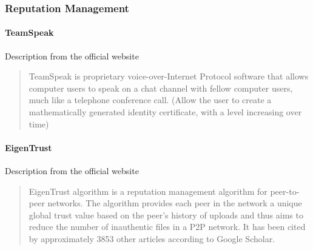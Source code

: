 
\subsubsection{Reputation Management}

\paragraph{TeamSpeak}
Description from the official website \cite{TeamSpeak}
\blockquote{TeamSpeak is proprietary voice-over-Internet Protocol software that allows computer users to speak on a chat channel with fellow computer users, much like a telephone conference call. (Allow the user to create a mathematically generated identity certificate, with a level increasing over time)}

\paragraph{EigenTrust}
Description from the official website \cite{EigenTrust}
\blockquote{EigenTrust algorithm is a reputation management algorithm for peer-to-peer networks. The algorithm provides each peer in the network a unique global trust value based on the peer's history of uploads and thus aims to reduce the number of inauthentic files in a P2P network. It has been cited by approximately 3853 other articles according to Google Scholar.}

